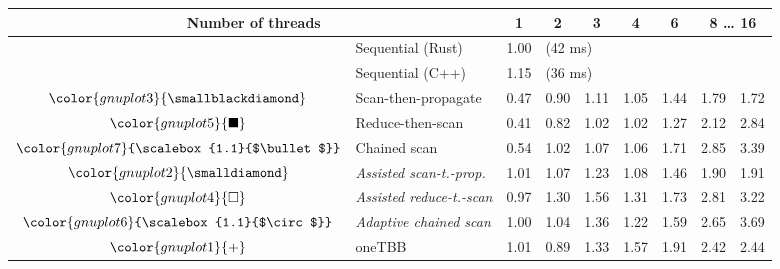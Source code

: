 \begin{tabular}{clrrrrrrr}
\toprule
\multicolumn{2}{c}{\textbf{Number of threads}} & \multicolumn{1}{c}{\textbf{ 1 }} & \multicolumn{1}{c}{\textbf{ 2 }} & \multicolumn{1}{c}{\textbf{ 3 }} & \multicolumn{1}{c}{\textbf{ 4 }} & \multicolumn{1}{c}{\textbf{ 6 }} & \multicolumn{2}{c}{\textbf{ 8 } \dots \textbf{ 16 }} \\
\midrule
& Sequential (Rust) & \multicolumn{1}{r}{ 1.00 } & \multicolumn{ 6 }{l}{(42 ms)} \\
& Sequential (C++) & \multicolumn{1}{r}{ 1.15 } & \multicolumn{ 6 }{l}{(36 ms)} \\
\rowcolor{gnuplot3!10}$\color{gnuplot3}{\smallblackdiamond}$ & Scan-then-propagate & \cellcolor{gnuplot3!10} 0.47 & \cellcolor{gnuplot3!10} 0.90 & \cellcolor{gnuplot3!10} 1.11 & \cellcolor{gnuplot3!10} 1.05 & \cellcolor{gnuplot3!10} 1.44 & \cellcolor{gnuplot3!10} 1.79 & \cellcolor{gnuplot3!10} 1.72 \\
\rowcolor{gnuplot5!10}$\color{gnuplot5}{\blacksquare}$ & Reduce-then-scan & \cellcolor{gnuplot5!10} 0.41 & \cellcolor{gnuplot5!10} 0.82 & \cellcolor{gnuplot5!10} 1.02 & \cellcolor{gnuplot5!10} 1.02 & \cellcolor{gnuplot5!10} 1.27 & \cellcolor{gnuplot5!10} 2.12 & \cellcolor{gnuplot5!10} 2.84 \\
\rowcolor{gnuplot7!10}$\color{gnuplot7}{\scalebox{1.1}{$\bullet$}}$ & Chained scan & \cellcolor{gnuplot7!10} 0.54 & \cellcolor{gnuplot7!10} 1.02 & \cellcolor{gnuplot7!10} 1.07 & \cellcolor{gnuplot7!10} 1.06 & \cellcolor{gnuplot7!10} 1.71 & \cellcolor{gnuplot7!10} 2.85 & \cellcolor{gnuplot7!10} 3.39 \\
\rowcolor{gnuplot2!30}$\color{gnuplot2}{\smalldiamond}$ & \textit{Assisted scan-t.-prop.} & \cellcolor{gnuplot2!30} 1.01 & \cellcolor{gnuplot2!30} 1.07 & \cellcolor{gnuplot2!30} 1.23 & \cellcolor{gnuplot2!30} 1.08 & \cellcolor{gnuplot2!30} 1.46 & \cellcolor{gnuplot2!30} 1.90 & \cellcolor{gnuplot2!30} 1.91 \\
\rowcolor{gnuplot4!30}$\color{gnuplot4}{\square}$ & \textit{Assisted reduce-t.-scan} & \cellcolor{gnuplot4!30} 0.97 & \cellcolor{gnuplot4!30} 1.30 & \cellcolor{gnuplot4!30} 1.56 & \cellcolor{gnuplot4!30} 1.31 & \cellcolor{gnuplot4!30} 1.73 & \cellcolor{gnuplot4!30} 2.81 & \cellcolor{gnuplot4!30} 3.22 \\
\rowcolor{gnuplot6!30}$\color{gnuplot6}{\scalebox{1.1}{$\circ$}}$ & \textit{Adaptive chained scan} & \cellcolor{gnuplot6!30} 1.00 & \cellcolor{gnuplot6!30} 1.04 & \cellcolor{gnuplot6!30} 1.36 & \cellcolor{gnuplot6!30} 1.22 & \cellcolor{gnuplot6!30} 1.59 & \cellcolor{gnuplot6!30} 2.65 & \cellcolor{gnuplot6!30} 3.69 \\
\rowcolor{gnuplot1!10}$\color{gnuplot1}{+}$ & oneTBB & \cellcolor{gnuplot1!10} 1.01 & \cellcolor{gnuplot1!10} 0.89 & \cellcolor{gnuplot1!10} 1.33 & \cellcolor{gnuplot1!10} 1.57 & \cellcolor{gnuplot1!10} 1.91 & \cellcolor{gnuplot1!10} 2.42 & \cellcolor{gnuplot1!10} 2.44 \\
\bottomrule
\end{tabular}

